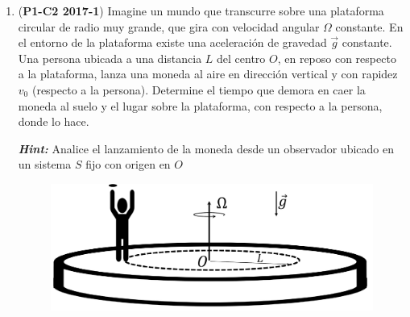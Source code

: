 \documentclass[letterpaper,11pt]{article}
\begin{document}
\begin{enumerate}
\item (\textbf{P1-C2 2017-1}) Imagine un mundo que transcurre sobre una plataforma circular de radio muy grande, que gira con velocidad angular $\Omega$ constante. En el entorno de la plataforma existe una aceleración de gravedad $\vec{g}$ constante. Una persona ubicada a una distancia $L$ del centro $O$, en reposo con respecto a la plataforma, lanza una moneda al aire en dirección vertical y con rapidez $v_0$ (respecto a la persona). Determine el tiempo que demora en caer la moneda al suelo y el lugar sobre la plataforma, con respecto a la persona, donde lo hace.

\textbf{\textit{Hint:}} Analice el lanzamiento de la moneda desde un observador ubicado en un sistema $S$ fijo con origen en $O$

\begin{figure}[H]
    \centering
    \includegraphics[width = 0.4\linewidth]{2021-1/Imagenes/aux4/moneda-circulo.pdf}
\end{figure}

\end{enumerate}
\end{document}
